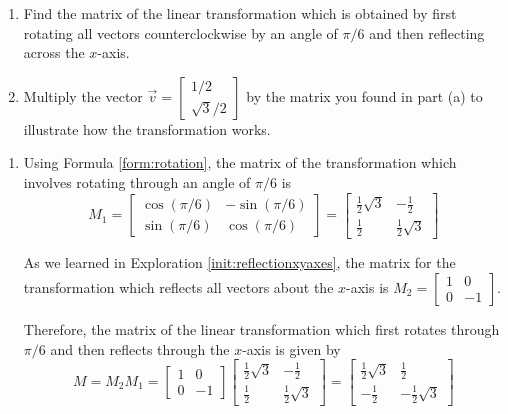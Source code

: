 \documentclass{ximera}
\begin{document}
\begin{example}\label{exa:rotationreflection}
\begin{enumerate}
    \item Find the matrix of the linear transformation which is obtained by first rotating all vectors counterclockwise by an angle of $\pi /6$ and then reflecting across the $x$-axis.
    \item Multiply the vector $\vec{v}=\begin{bmatrix}
    1/2 \\ \sqrt{3}/2 \end{bmatrix}$ by the matrix you found in part (a) to illustrate how the transformation works.
\end{enumerate}


\begin{explanation}
\begin{enumerate}
    \item 

Using Formula \ref{form:rotation}, the matrix of the transformation which
involves rotating through an angle of $\pi /6$ is
\begin{equation*}
M_1 =
\begin{bmatrix}
\cos \left( \pi /6\right) & -\sin \left( \pi /6\right) \\
\sin \left( \pi /6\right) & \cos \left( \pi /6\right)
\end{bmatrix}
 =
\begin{bmatrix}
\frac{1}{2}\sqrt{3} & -\frac{1}{2} \\
\frac{1}{2} & \frac{1}{2}\sqrt{3}
\end{bmatrix}
\end{equation*}

As we learned in Exploration \ref{init:reflectionxyaxes}, the matrix for the transformation which reflects all vectors about the $x$-axis is $M_2 = \begin{bmatrix}1 & 0 \\ 0 & -1 \end{bmatrix}$.

Therefore, the matrix of the linear transformation which first rotates
through $\pi /6$ and then reflects through the $x$-axis is given by
\begin{equation*}
M = M_2 M_1 = 
\begin{bmatrix}1 & 0 \\ 0 & -1 \end{bmatrix} \begin{bmatrix}
\frac{1}{2}\sqrt{3} & -\frac{1}{2} \\
\frac{1}{2} & \frac{1}{2}\sqrt{3}
\end{bmatrix} = \begin{bmatrix}
\frac{1}{2}\sqrt{3} & \frac{1}{2} \\
-\frac{1}{2} & -\frac{1}{2}\sqrt{3}
\end{bmatrix}
\end{equation*}


\end{enumerate}
\end{explanation}
\end{example}
\end{document}
